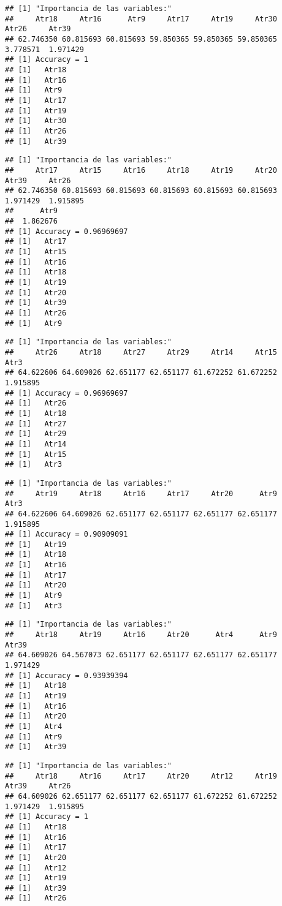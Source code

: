 \documentclass[
]{article}
\begin{document}
\begin{verbatim}
## [1] "Importancia de las variables:"
##     Atr18     Atr16      Atr9     Atr17     Atr19     Atr30     Atr26     Atr39 
## 62.746350 60.815693 60.815693 59.850365 59.850365 59.850365  3.778571  1.971429 
## [1] Accuracy = 1
## [1]   Atr18
## [1]   Atr16
## [1]   Atr9
## [1]   Atr17
## [1]   Atr19
## [1]   Atr30
## [1]   Atr26
## [1]   Atr39
\end{verbatim}

\begin{verbatim}
## [1] "Importancia de las variables:"
##     Atr17     Atr15     Atr16     Atr18     Atr19     Atr20     Atr39     Atr26 
## 62.746350 60.815693 60.815693 60.815693 60.815693 60.815693  1.971429  1.915895 
##      Atr9 
##  1.862676 
## [1] Accuracy = 0.96969697
## [1]   Atr17
## [1]   Atr15
## [1]   Atr16
## [1]   Atr18
## [1]   Atr19
## [1]   Atr20
## [1]   Atr39
## [1]   Atr26
## [1]   Atr9
\end{verbatim}

\begin{verbatim}
## [1] "Importancia de las variables:"
##     Atr26     Atr18     Atr27     Atr29     Atr14     Atr15      Atr3 
## 64.622606 64.609026 62.651177 62.651177 61.672252 61.672252  1.915895 
## [1] Accuracy = 0.96969697
## [1]   Atr26
## [1]   Atr18
## [1]   Atr27
## [1]   Atr29
## [1]   Atr14
## [1]   Atr15
## [1]   Atr3
\end{verbatim}

\begin{verbatim}
## [1] "Importancia de las variables:"
##     Atr19     Atr18     Atr16     Atr17     Atr20      Atr9      Atr3 
## 64.622606 64.609026 62.651177 62.651177 62.651177 62.651177  1.915895 
## [1] Accuracy = 0.90909091
## [1]   Atr19
## [1]   Atr18
## [1]   Atr16
## [1]   Atr17
## [1]   Atr20
## [1]   Atr9
## [1]   Atr3
\end{verbatim}

\begin{verbatim}
## [1] "Importancia de las variables:"
##     Atr18     Atr19     Atr16     Atr20      Atr4      Atr9     Atr39 
## 64.609026 64.567073 62.651177 62.651177 62.651177 62.651177  1.971429 
## [1] Accuracy = 0.93939394
## [1]   Atr18
## [1]   Atr19
## [1]   Atr16
## [1]   Atr20
## [1]   Atr4
## [1]   Atr9
## [1]   Atr39
\end{verbatim}

\begin{verbatim}
## [1] "Importancia de las variables:"
##     Atr18     Atr16     Atr17     Atr20     Atr12     Atr19     Atr39     Atr26 
## 64.609026 62.651177 62.651177 62.651177 61.672252 61.672252  1.971429  1.915895 
## [1] Accuracy = 1
## [1]   Atr18
## [1]   Atr16
## [1]   Atr17
## [1]   Atr20
## [1]   Atr12
## [1]   Atr19
## [1]   Atr39
## [1]   Atr26
\end{verbatim}
\end{document}
